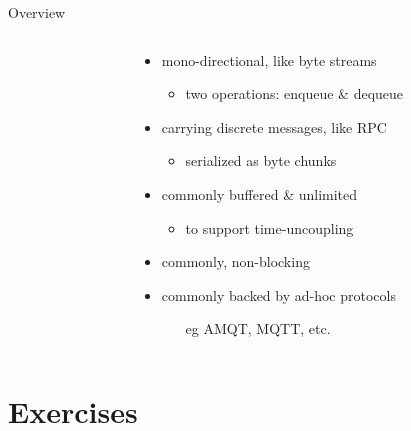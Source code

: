 \documentclass{beamer}\mode<presentation>{\usetheme{AMSBolognaFC}}
\begin{document}
\begin{frame}{Overview}
\begin{columns}
\begin{column}{.26\linewidth}
\begin{center}
            \end{center}
        \end{column}
        \hfill
        \begin{column}{.72\linewidth}
            \begin{itemize}
                \item \alert{mono-directional}, like byte streams
                \begin{itemize}
                    \item two operations: enqueue \& dequeue
                \end{itemize}

                \smallskip

                \item carrying discrete \alert{messages}, like RPC
                \begin{itemize}
                    \item serialized as byte chunks
                \end{itemize}

                \smallskip

                \item commonly \alert{buffered} \& unlimited
                \begin{itemize}
                    \item to support \alert{time-uncoupling}
                \end{itemize}

                \smallskip

                \item commonly, \alert{non-blocking}

                \smallskip

                \item commonly backed by ad-hoc \alert{protocols}
                \begin{itemize}
                    \item[eg] AMQT, MQTT, etc.
                \end{itemize}
            \end{itemize}
        \end{column}
    \end{columns}


\end{frame}

\section{Exercises}
\end{document}
